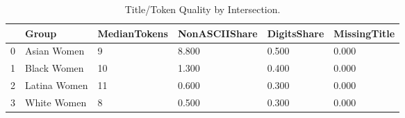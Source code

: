 \begin{table}[htbp]
\centering
\caption{Title/Token Quality by Intersection.}
\label{tab:eda_title_quality_by_group}
\begin{tabular}{llllll}
\toprule
 & Group & MedianTokens & NonASCIIShare & DigitsShare & MissingTitle \\
\midrule
0 & Asian Women & 9 & 8.800 & 0.500 & 0.000 \\
1 & Black Women & 10 & 1.300 & 0.400 & 0.000 \\
2 & Latina Women & 11 & 0.600 & 0.300 & 0.000 \\
3 & White Women & 8 & 0.500 & 0.300 & 0.000 \\
\bottomrule
\end{tabular}

\end{table}